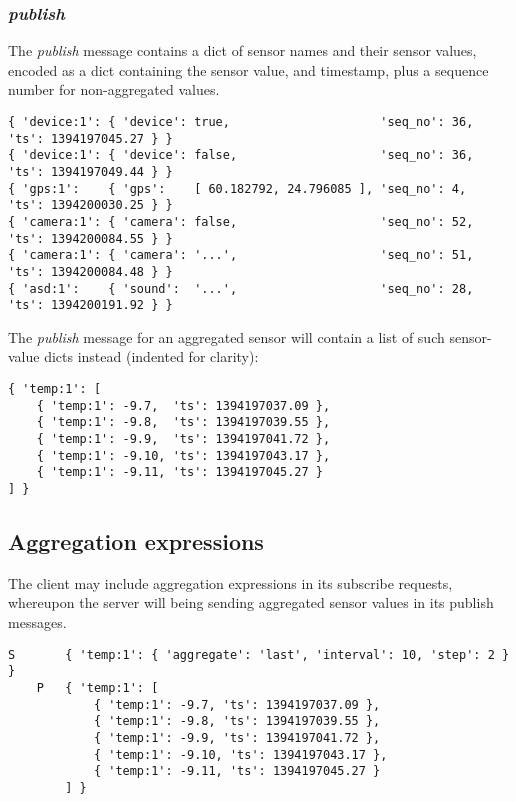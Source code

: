 \documentclass[a4paper]{article}
\begin{document}
\subsubsection{\emph{publish}}

The \emph{publish} message contains a dict of sensor names and their sensor values, encoded as a dict containing the sensor value, and timestamp, plus a sequence number for non-aggregated values.
\begin{verbatim}
{ 'device:1': { 'device': true,                     'seq_no': 36, 'ts': 1394197045.27 } }
{ 'device:1': { 'device': false,                    'seq_no': 36, 'ts': 1394197049.44 } }
{ 'gps:1':    { 'gps':    [ 60.182792, 24.796085 ], 'seq_no': 4,  'ts': 1394200030.25 } }
{ 'camera:1': { 'camera': false,                    'seq_no': 52, 'ts': 1394200084.55 } }
{ 'camera:1': { 'camera': '...',                    'seq_no': 51, 'ts': 1394200084.48 } }
{ 'asd:1':    { 'sound':  '...',                    'seq_no': 28, 'ts': 1394200191.92 } }
\end{verbatim}

The \emph{publish} message for an aggregated sensor will contain a list of such sensor-value dicts instead (indented for clarity):
\begin{verbatim}
{ 'temp:1': [
    { 'temp:1': -9.7,  'ts': 1394197037.09 },
    { 'temp:1': -9.8,  'ts': 1394197039.55 },
    { 'temp:1': -9.9,  'ts': 1394197041.72 },
    { 'temp:1': -9.10, 'ts': 1394197043.17 },
    { 'temp:1': -9.11, 'ts': 1394197045.27 }
] }
\end{verbatim}

\subsection{Aggregation expressions}

The client may include aggregation expressions in its subscribe requests, whereupon the server will being sending aggregated sensor values in its publish messages.

\begin{verbatim}
S       { 'temp:1': { 'aggregate': 'last', 'interval': 10, 'step': 2 } }
    P   { 'temp:1': [
            { 'temp:1': -9.7, 'ts': 1394197037.09 },
            { 'temp:1': -9.8, 'ts': 1394197039.55 },
            { 'temp:1': -9.9, 'ts': 1394197041.72 },
            { 'temp:1': -9.10, 'ts': 1394197043.17 },
            { 'temp:1': -9.11, 'ts': 1394197045.27 }
        ] }
\end{verbatim}
\end{document}

